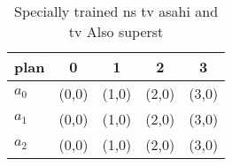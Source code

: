 \documentclass[a4paper]{article}
\begin{document}
\begin{table}
\begin{adjustbox}{width=0.5\columnwidth}
\begin{tabular}{|l|l|l|l|l|}
\hline
\textbf{plan} & \multicolumn{1}{c|}{\textbf{0}} & \multicolumn{1}{c|}{\textbf{1}} & \multicolumn{1}{c|}{\textbf{2}} & \multicolumn{1}{c|}{\textbf{3}} \\ \hline
\textbf{$a_0$}  & (0,0) & (1,0) & (2,0) & (3,0) \\ \hline
\textbf{$a_1$}  & (0,0) & (1,0) & (2,0) & (3,0) \\ \hline
\textbf{$a_2$}  & (0,0) & (1,0) & (2,0) & (3,0) \\ \hline
\end{tabular}
\end{adjustbox}
\caption{Specially trained ns tv asahi and tv Also superst
}
\end{table}
\end{document}

